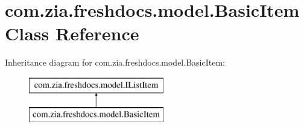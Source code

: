 \hypertarget{classcom_1_1zia_1_1freshdocs_1_1model_1_1_basic_item}{\section{com.\-zia.\-freshdocs.\-model.\-Basic\-Item Class Reference}
\label{classcom_1_1zia_1_1freshdocs_1_1model_1_1_basic_item}
}
Inheritance diagram for com.\-zia.\-freshdocs.\-model.\-Basic\-Item\-:\begin{figure}[H]
\begin{center}
\leavevmode
\includegraphics[height=2.000000cm]{classcom_1_1zia_1_1freshdocs_1_1model_1_1_basic_item}
\end{center}
\end{figure}
